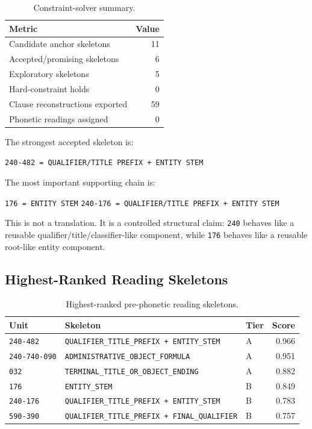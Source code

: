 \begin{table}[htbp]
\centering
\begin{tabular}{lr}
\toprule
\textbf{Metric} & \textbf{Value} \\
\midrule
Candidate anchor skeletons & 11 \\
Accepted/promising skeletons & 6 \\
Exploratory skeletons & 5 \\
Hard-constraint holds & 0 \\
Clause reconstructions exported & 59 \\
Phonetic readings assigned & 0 \\
\bottomrule
\end{tabular}
\caption{Constraint-solver summary.}
\label{tab:constraint-solver-summary}
\end{table}

The strongest accepted skeleton is:

\begin{center}
\texttt{240-482 = QUALIFIER/TITLE PREFIX + ENTITY STEM}
\end{center}

The most important supporting chain is:

\begin{center}
\texttt{176 = ENTITY STEM}
\qquad
\texttt{240-176 = QUALIFIER/TITLE PREFIX + ENTITY STEM}
\end{center}

This is not a translation. It is a controlled structural claim: \texttt{240} behaves like a reusable qualifier/title/classifier-like component, while \texttt{176} behaves like a reusable root-like entity component.

\subsection{Highest-Ranked Reading Skeletons}

\begin{table}[htbp]
\centering
\footnotesize
\begin{tabular}{lp{}lr}
\toprule
\textbf{Unit} & \textbf{Skeleton} & \textbf{Tier} & \textbf{Score} \\
\midrule
\texttt{240-482} & \texttt{QUALIFIER\_TITLE\_PREFIX + ENTITY\_STEM} & A & 0.966 \\
\texttt{240-740-090} & \texttt{ADMINISTRATIVE\_OBJECT\_FORMULA} & A & 0.951 \\
\texttt{032} & \texttt{TERMINAL\_TITLE\_OR\_OBJECT\_ENDING} & A & 0.882 \\
\texttt{176} & \texttt{ENTITY\_STEM} & B & 0.849 \\
\texttt{240-176} & \texttt{QUALIFIER\_TITLE\_PREFIX + ENTITY\_STEM} & B & 0.783 \\
\texttt{590-390} & \texttt{QUALIFIER\_TITLE\_PREFIX + FINAL\_QUALIFIER} & B & 0.757 \\
\bottomrule
\end{tabular}
\caption{Highest-ranked pre-phonetic reading skeletons.}
\label{tab:constraint-solver-top-skeletons}
\end{table}

